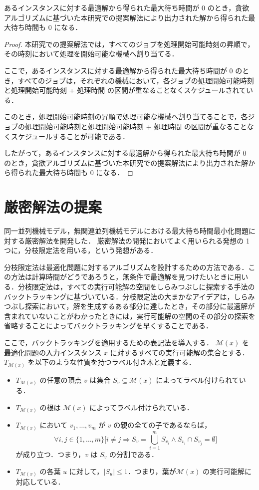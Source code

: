 \documentclass[12pt]{optlab-bachelor}
\begin{document}
\begin{lemma}
  あるインスタンスに対する最適解から得られた最大待ち時間が $0$ のとき，貪欲アルゴリズムに基づいた本研究での提案解法により出力された解から得られた最大待ち時間も $0$ になる．
\end{lemma}

\begin{proof}
  本研究での提案解法では，すべてのジョブを処理開始可能時刻の昇順で，その時刻において処理を開始可能な機械へ割り当てる．

  ここで，あるインスタンスに対する最適解から得られた最大待ち時間が 0 のとき，すべてのジョブは，それぞれの機械において，各ジョブの処理開始可能時刻と処理開始可能時刻 + 処理時間 の区間が重なることなくスケジュールされている．

  このとき，処理開始可能時刻の昇順で処理可能な機械へ割り当てることで，各ジョブの処理開始可能時刻と処理開始可能時刻 + 処理時間 の区間が重なることなくスケジュールすることが可能である．

  したがって，あるインスタンスに対する最適解から得られた最大待ち時間が 0 のとき，貪欲アルゴリズムに基づいた本研究での提案解法により出力された解から得られた最大待ち時間も 0 になる．
\end{proof}

\section{厳密解法の提案}\label{5_s_2}
同一並列機械モデル，無関連並列機械モデルにおける最大待ち時間最小化問題に対する厳密解法を開発した．
厳密解法の開発においてよく用いられる発想の 1 つに，分枝限定法を用いる，という発想がある．

分枝限定法は最適化問題に対するアルゴリズムを設計するための方法である．この方法は計算時間がどうであろうと，無条件で最適解を見つけたいときに用いる．分枝限定法は，すべての実行可能解の空間をしらみつぶしに探索する手法のバックトラッキングに基づいている．分枝限定法の大まかなアイデアは，しらみつぶし探索において，解を生成するある部分に達したとき，その部分に最適解が含まれていないことがわかったときには，実行可能解の空間のその部分の探索を省略することによってバックトラッキングを早くすることである．

ここで，バックトラッキングを適用するための表記法を導入する．
$\mathcal{M}(x)$ を最適化問題の入力インスタンス $x$ に対するすべての実行可能解の集合とする．$T_{\mathcal{M}(x)}$ を以下のような性質を持つラベル付き木と定義する．
\begin{itemize}
  \item $T_{\mathcal{M}(x)}$ の任意の頂点 $v$ は集合 $S_v \subseteq \mathcal{M}(x)$ によってラベル付けられている．
  \item $T_{\mathcal{M}(x)}$ の根は $\mathcal{M}(x)$ によってラベル付けられている．
  \item $T_{\mathcal{M}(x)}$ において $v_1,\ldots,v_m$ が $v$ の親の全ての子であるならば，$$\forall i,j \in \{1,\ldots,m\}\bigg[i \neq j \Rightarrow S_v = \bigcup_{i = 1}^{m}S_{v_i} \land S_{v_i} \cap S_{v_j} = \emptyset \bigg]$$ が成り立つ．つまり，$v$ は $S_v$ の分割である．
  \item $T_{\mathcal{M}(x)}$ の各葉 $u$ に対して，$|S_u| \le 1$．つまり，葉が$\mathcal{M}(x)$ の実行可能解に対応している．
\end{itemize}
\end{document}
